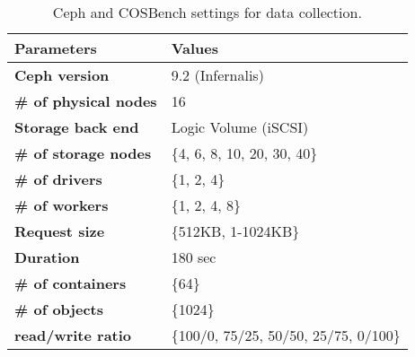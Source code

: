 \begin{table}[htp]
 \centering
 \caption{Ceph and COSBench settings for data collection.}
 \begin{tabular}{ ll  }
  \hline
  \textbf{\normalsize{Parameters}} & \textbf{\normalsize{Values}} \\
  \hline
  \textbf{Ceph version} & 9.2 (Infernalis) \\
  \textbf{\# of physical nodes} & 16 \\
  \textbf{Storage back end} & Logic Volume (iSCSI) \\
  \textbf{\# of storage nodes} & \{4, 6, 8, 10, 20, 30, 40\}\\
  \textbf{\# of drivers} & \{1, 2, 4\} \\
  \textbf{\# of workers} & \{1, 2, 4, 8\} \\
  \textbf{Request size} & \{512KB, 1-1024KB\} \\
  \textbf{Duration} & 180 sec \\
  \textbf{\# of containers} & \{64\} \\
  \textbf{\# of objects} & \{1024\} \\
  \textbf{read/write ratio} & \{100/0, 75/25, 50/50, 25/75, 0/100\} \\
  \hline
 \end{tabular}
 \label{tab:cosbench_configurations}
\end{table}
